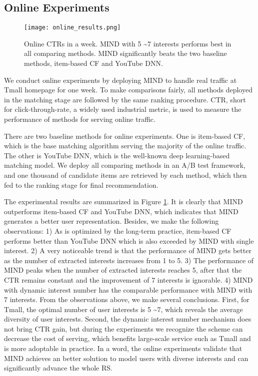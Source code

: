 \documentclass[sigconf]{acmart}
\begin{document}
\subsection{Online Experiments}

\begin{figure}[h]
  \centering
  \texttt{[image: online\_results.png]}
  \caption{Online CTRs in a week. MIND with 5 \textasciitilde 7 interests performs best in all comparing methods. MIND significantly beats the two baseline methods, item-based CF and YouTube DNN.}
  \label{fig:online_results}
\end{figure}

We conduct online experiments by deploying MIND to handle real traffic at Tmall homepage for one week.
To make comparisons fairly, all methods deployed in the matching stage are followed by the same ranking procedure.
CTR, short for click-through-rate, a widely used industrial metric, is used to measure the performance of methods for serving online traffic.

There are two baseline methods for online experiments.
One is item-based CF, which is the base matching algorithm serving the majority of the online traffic.
The other is YouTube DNN, which is the well-known deep learning-based matching model.
We deploy all comparing methods in an A/B test framework, and one thousand of candidate items are retrieved by each method, which then fed to the ranking stage for final recommendation.

The experimental results are summarized in Figure \ref{fig:online_results}.
It is clearly that MIND outperforms item-based CF and YouTube DNN, which indicates that MIND generates a better user representation.
Besides, we make the following observations:
1) As is optimized by the long-term practice, item-based CF performs better than YouTube DNN which is also exceeded by MIND with single interest.
2) A very noticeable trend is that the performance of MIND gets better as the number of extracted interests increases from 1 to 5.
3) The performance of MIND peaks when the number of extracted interests reaches 5, after that the CTR remains constant and the improvement of 7 interests is ignorable.
4) MIND with dynamic interest number has the comparable performance with MIND with 7 interests.
From the observations above, we make several conclusions.
First, for Tmall, the optimal number of user interests is 5 \textasciitilde 7, which reveals the average diversity of user interests.
Second, the dynamic interest number mechanism does not bring CTR gain, but during the experiments we recognize the scheme can decrease the cost of serving, which benefits large-scale service such as Tmall and is more adoptable in practice.
In a word, the online experiments validate that MIND achieves an better solution to model users with diverse interests and can significantly advance the whole RS.
\end{document}
